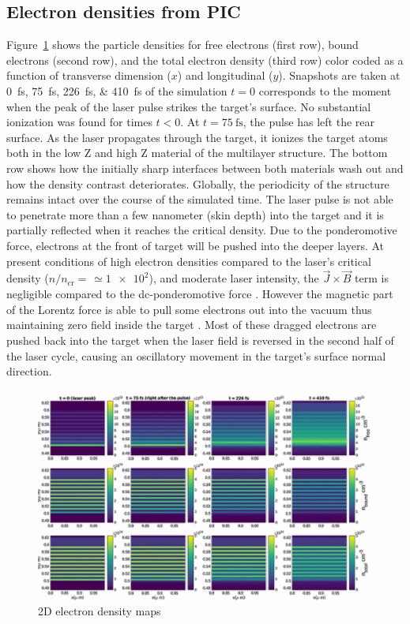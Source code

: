 \documentclass[preprint, 12pt]{elsarticle}
\begin{document}
\subsection{Electron densities from PIC\label{sec:electron_densities}}
Figure~\ref{fig:pic_edens_2D} shows the particle densities for free electrons
(first row), bound electrons (second row), and the total electron density (third
row) color coded as a function of transverse dimension ($x$) and longitudinal
($y$). Snapshots are taken at \SIlist{0;75;226;410}{\fs} of the simulation
$t=0$ corresponds to the moment when the peak of the laser pulse strikes the
target's surface. No substantial ionization was found for times $t<0$.
At $t=\SI{75}{\fs}$, the pulse has left the rear surface.
As the laser propagates through the target, it ionizes the target atoms both in
the low Z and high Z material of the multilayer structure. The bottom row shows
how the initially sharp interfaces between both materials wash out and how the
density contrast deteriorates. Globally, the periodicity of the structure
remains intact over the course of the simulated time.
The laser pulse is not able to penetrate more than a few nanometer (skin depth)
into the target and it is partially reflected when it reaches the critical density.
Due to the ponderomotive force, electrons at the front of target will be pushed
into the deeper layers. At present conditions of high electron densities
compared to the laser's critical density ($n/n_\text{cr} = \frac{}{}\simeq
\num{1e2}$), and moderate laser intensity, the  $\vec{J} \times \vec{B}$ term is
negligible compared to the dc-ponderomotive force \cite{TBD}.
However the magnetic part of the Lorentz force is able to pull some electrons out into the vacuum
thus maintaining zero field inside the target \cite{TBD}.
Most of these dragged electrons are pushed back into the target when the laser
field is reversed in the second half of the laser cycle, causing an oscillatory
movement in the target's surface normal direction.
%
\begin{figure}[ht]
  \centering\includegraphics[width=1.0\linewidth]{paper_plot.png}
  \caption{2D electron density maps}
  \label{fig:pic_edens_2D}
\end{figure}
\end{document}

